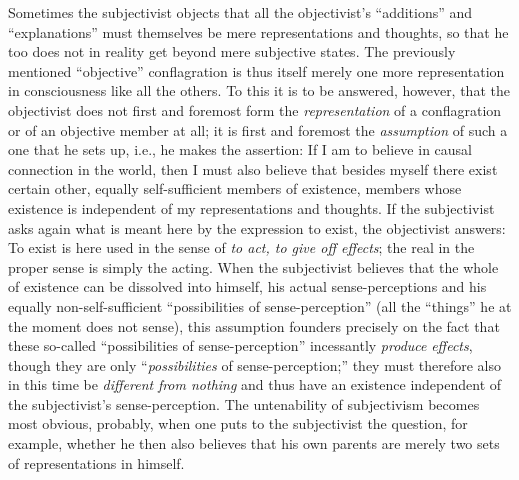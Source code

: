 \documentclass[12pt,a4paper,openany]{book}
\newcommand{\opage}[1]{\marginnote{\footnotesize\textit{[#1]}}}
\begin{document}
Sometimes the subjectivist objects that all the objectivist's ``additions'' and
``explanations'' must themselves be mere representations and thoughts, so that he too
does not in reality get beyond mere subjective states. The previously mentioned
``objective'' conflagration is thus itself merely one more representation in consciousness
like all the others. To this it is to be answered, however, that the objectivist does not
first and foremost form the \emph{representation} of a conflagration or of an objective
member at all; it is first and foremost the \emph{assumption} of such a one that he sets
up, i.e., he makes the assertion: If I am to believe in causal connection in the world,
then I must also believe that besides myself there exist certain other, equally
self-sufficient members of existence, members whose existence is independent of my
representations and thoughts. If the subjectivist
\setcounter{footnote}{0}%
\opage{255}asks again what is meant here by the expression to exist, the objectivist answers: To
exist is here used in the sense of \emph{to act, to give off effects}; the real in the
proper sense is simply the acting. When the subjectivist believes that the whole of
existence can be dissolved into himself, his actual sense-perceptions and his equally
non-self-sufficient ``possibilities of sense-perception'' (all the ``things'' he at the
moment does not sense), this assumption founders precisely on the fact that these
so-called ``possibilities of sense-perception'' incessantly \emph{produce}
\emph{effects}, though they are only ``\emph{possibilities} of sense-perception;'' they
must therefore also in this time be \emph{different}
\emph{from nothing} and thus have an existence independent of the subjectivist's
sense-perception. The untenability of subjectivism becomes most obvious, probably, when
one puts to the subjectivist the question, for example, whether he then also believes
that his own parents are merely two sets of representations in himself.
\end{document}
